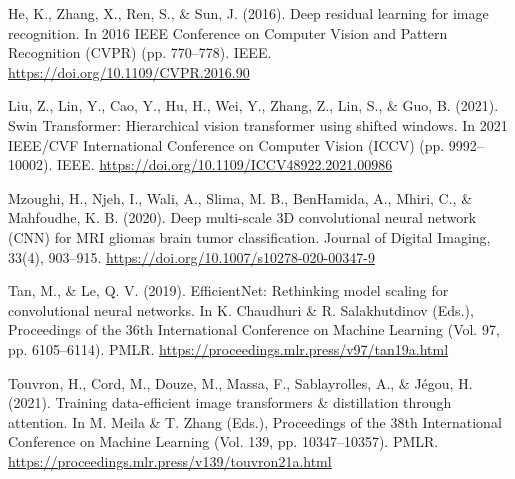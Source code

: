 \documentclass{article}
\begin{document}
\clearpage
\begingroup
\renewcommand{\bibsection}{\section*{References}}
\begin{thebibliography}{}

He, K., Zhang, X., Ren, S., \& Sun, J. (2016). Deep residual learning for image recognition.
In 2016 IEEE Conference on Computer Vision and Pattern Recognition (CVPR) (pp. 770--778).
IEEE. \url{https://doi.org/10.1109/CVPR.2016.90}

Liu, Z., Lin, Y., Cao, Y., Hu, H., Wei, Y., Zhang, Z., Lin, S., \& Guo, B. (2021).
Swin Transformer: Hierarchical vision transformer using shifted windows.
In 2021 IEEE/CVF International Conference on Computer Vision (ICCV) (pp. 9992--10002).
IEEE. \url{https://doi.org/10.1109/ICCV48922.2021.00986}

Mzoughi, H., Njeh, I., Wali, A., Slima, M. B., BenHamida, A., Mhiri, C., \& Mahfoudhe, K. B. (2020).
Deep multi-scale 3D convolutional neural network (CNN) for MRI gliomas brain tumor classification.
Journal of Digital Imaging, 33(4), 903--915.
\url{https://doi.org/10.1007/s10278-020-00347-9}

Tan, M., \& Le, Q. V. (2019). EfficientNet: Rethinking model scaling for convolutional neural networks.
In K. Chaudhuri \& R. Salakhutdinov (Eds.), Proceedings of the 36th International Conference on Machine Learning
(Vol. 97, pp. 6105--6114). PMLR. \url{https://proceedings.mlr.press/v97/tan19a.html}

Touvron, H., Cord, M., Douze, M., Massa, F., Sablayrolles, A., \& J\'egou, H. (2021).
Training data-efficient image transformers \& distillation through attention.
In M. Meila \& T. Zhang (Eds.), Proceedings of the 38th International Conference on Machine Learning
(Vol. 139, pp. 10347--10357). PMLR. \url{https://proceedings.mlr.press/v139/touvron21a.html}

\end{thebibliography}
\endgroup
\end{document}
